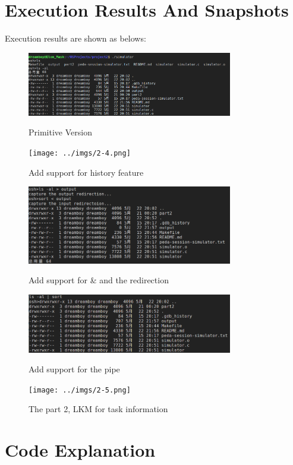 \documentclass[12pt]{extarticle}
\newcommand{\<}{\langle}
\renewcommand{\>}{\rangle}
\theoremstyle{definition}
\begin{document}
	\section{Execution Results And Snapshots}
	Execution results are shown as belows:
	\begin{figure}[H]
		\centering 
		\includegraphics[width=0.8\textwidth]{../imgs/2-1.png}
		\label{fig1}
		\caption{Primitive Version}
	\end{figure}
	\begin{figure}[H]
		\centering 
		\texttt{[image: ../imgs/2-4.png]}
		\label{fig2}
		\caption{Add support for history feature}
	\end{figure}
	\begin{figure}[H]
		\centering 
		\includegraphics[width=0.8\textwidth]{../imgs/2-2.png}
		\label{fig3}
		\caption{Add support for \& and the redirection}
	\end{figure}
	\begin{figure}[H]
		\centering 
		\includegraphics[width=0.8\textwidth]{../imgs/2-3.png}
		\label{fig4}
		\caption{Add support for the pipe}
	\end{figure}
	\begin{figure}[H]
		\centering 
		\texttt{[image: ../imgs/2-5.png]}
		\label{fig5}
		\caption{The part 2, LKM for task information}
	\end{figure}
	\section{Code Explanation}
\end{document}
